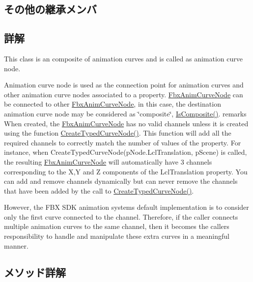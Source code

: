 \subsection*{その他の継承メンバ}


\subsection{詳解}
This class is an composite of animation curves and is called as animation curve node.

Animation curve node is used as the connection point for animation curves and other animation curve nodes associated to a property. \hyperlink{class_fbx_anim_curve_node}{Fbx\+Anim\+Curve\+Node} can be connected to other \hyperlink{class_fbx_anim_curve_node}{Fbx\+Anim\+Curve\+Node}, in this case, the destination animation curve node may be considered as \char`\"{}composite\char`\"{}, \hyperlink{class_fbx_anim_curve_node_ad0fd9df109fb4e9c8702d37f03b6cc03}{Is\+Composite()}. remarks When created, the \hyperlink{class_fbx_anim_curve_node}{Fbx\+Anim\+Curve\+Node} has no valid channels unless it is created using the function \hyperlink{class_fbx_anim_curve_node_a588814e5973e080f84c54438623ddf7e}{Create\+Typed\+Curve\+Node()}. This function will add all the required channels to correctly match the number of values of the property. For instance, when Create\+Typed\+Curve\+Node(p\+Node.\+Lcl\+Translation, p\+Scene) is called, the resulting \hyperlink{class_fbx_anim_curve_node}{Fbx\+Anim\+Curve\+Node} will automatically have 3 channels corresponding to the X,Y and Z components of the Lcl\+Translation property. You can add and remove channels dynamically but can never remove the channels that have been added by the call to \hyperlink{class_fbx_anim_curve_node_a588814e5973e080f84c54438623ddf7e}{Create\+Typed\+Curve\+Node()}.

However, the F\+BX S\+DK animation system\textquotesingle{}s default implementation is to consider only the first curve connected to the channel. Therefore, if the caller connects multiple animation curves to the same channel, then it becomes the caller\textquotesingle{}s responsibility to handle and manipulate these extra curves in a meaningful manner. 

\subsection{メソッド詳解}
\mbox{\label{class_fbx_anim_curve_node_a985772edb8c85825adfef69c6bd06627}} 
